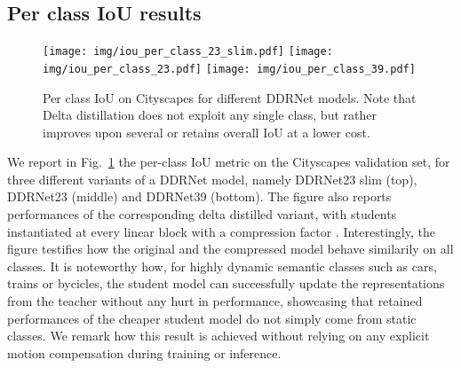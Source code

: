 \documentclass[runningheads]{llncs}
\begin{document}
\subsection{Per class IoU results}
\begin{figure}
    \centering
    \texttt{[image: img/iou\_per\_class\_23\_slim.pdf]}
    \texttt{[image: img/iou\_per\_class\_23.pdf]}
    \texttt{[image: img/iou\_per\_class\_39.pdf]}
    \caption{Per class IoU on Cityscapes for different DDRNet models. Note that Delta distillation does not exploit any single class, but rather improves upon several or retains overall IoU at a lower cost.}
    \label{fig:per_class_iou}
\end{figure} We report in Fig.~\ref{fig:per_class_iou} the per-class IoU metric on the Cityscapes validation set, for three different variants of a DDRNet model, namely DDRNet23 slim (top), DDRNet23 (middle) and DDRNet39 (bottom).
The figure also reports performances of the corresponding delta distilled variant, with students instantiated at every linear block with a compression factor .
Interestingly, the figure testifies how the original and the compressed model behave similarily on all classes.
It is noteworthy how, for highly dynamic semantic classes such as cars, trains or bycicles, the student model can successfully update the representations from the teacher without any hurt in performance, showcasing that retained performances of the cheaper student model do not simply come from static classes.
We remark how this result is achieved without relying on any explicit motion compensation during training or inference.
\end{document}
